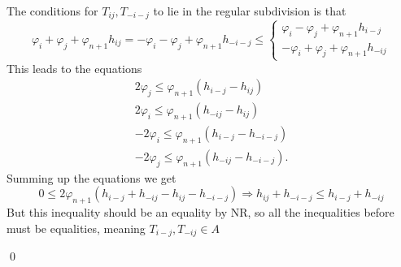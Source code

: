 \documentclass{myclass}
\begin{document}
The conditions for $T_{ij}, T_{-i-j}$ to lie in the regular subdivision is that 
\[
\varphi _i + \varphi _j + \varphi _{n+1}h_{ij} = -\varphi _i -\varphi _j + \varphi _{n+1}h_{-i-j} \le \begin{cases}
  \varphi _i -\varphi _j + \varphi _{n+1}h_{i-j} \\
  -\varphi _i + \varphi _j + \varphi _{n+1}h_{-ij}
\end{cases}
\] 
This leads to the equations
\begin{align*}
  2\varphi _j\le \varphi _{n+1}(h_{i-j}- h_{ij}) \\
  2\varphi _i\le \varphi _{n+1}(h_{-ij}- h_{ij}) \\
  -2\varphi _i\le \varphi _{n+1}(h_{i-j}- h_{-i-j}) \\
  -2\varphi _j\le \varphi _{n+1}(h_{-ij}- h_{-i-j})
.\end{align*}
Summing up the equations we get
\[
0\le 2\varphi_{n+1}(h_{i-j} + h_{-ij}-h_{ij}-h_{-i-j}) \Rightarrow h_{ij} + h_{-i-j} \le h_{i-j} + h_{-ij}
\] 
But this inequality should be an equality by NR, so all the inequalities before must be equalities, meaning $T_{i-j}, T_{-ij}\in A$ 

\qed
\end{document}
